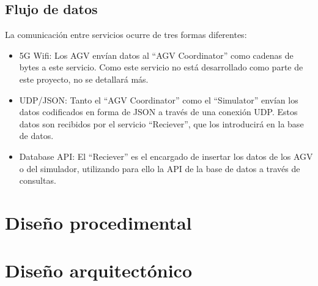 
\subsection{Flujo de datos}

La comunicación entre servicios ocurre de tres formas diferentes:
\begin{itemize}
    \item 5G Wifi: Los AGV envían datos al ``AGV Coordinator'' como cadenas de bytes a este servicio.
        Como este servicio no está desarrollado como parte de este proyecto, no se detallará más.
    \item UDP/JSON: Tanto el ``AGV Coordinator'' como el ``Simulator'' envían los datos codificados en 
        forma de JSON a través de una conexión UDP. Estos datos son recibidos por el servicio ``Reciever'',
        que los introducirá en la base de datos.
    \item Database API: El ``Reciever'' es el encargado de insertar los datos de los AGV o del simulador, 
        utilizando para ello la API de la base de datos a través de consultas.
\end{itemize}

\section{Diseño procedimental}


\section{Diseño arquitectónico}

